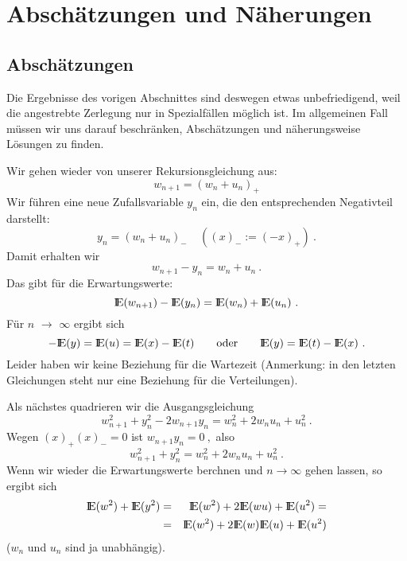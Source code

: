
\chapter{Abschätzungen und Näherungen}
\section{Abschätzungen}
Die Ergebnisse des vorigen Abschnittes sind deswegen etwas unbefriedigend, weil die angestrebte Zerlegung nur in
Spezialfällen möglich ist. Im allgemeinen Fall müssen wir uns darauf beschränken, Abschätzungen und
näherungsweise Lösungen zu finden.

Wir gehen wieder von unserer Rekursionsgleichung aus:
\[w_{n+1} = (w_{n}+u_{n})_{+} \]
Wir führen eine neue Zufallsvariable $y_{n}$ ein, die den entsprechenden Negativteil darstellt:
\[y_{n} = (w_{n}+u_{n})_{-}  ~ ~ ~ ~ ~ ((x)_{-} := (-x)_{+}) ~. \]
Damit erhalten wir
\[ w_{n+1}-y_{n} = w_{n}+u_{n} ~.\]
Das gibt für die Erwartungswerte:
\[{\rm I\kern-0.2em E}(w_{n+1})-{\rm I\kern-0.2em E}(y_{n}) = {\rm I\kern-0.2em E}(w_{n})+{\rm I\kern-0.2em E}(u_{n}) ~.\]
Für $n$ $\rightarrow$ $\infty$ ergibt sich
\[-{\rm I\kern-0.2em E}(y) = {\rm I\kern-0.2em E}(u) = {\rm I\kern-0.2em E}(x) - {\rm I\kern-0.2em E}(t) \qquad \mbox{oder} \qquad {\rm I\kern-0.2em E}(y) = {\rm I\kern-0.2em E}(t) - {\rm I\kern-0.2em E}(x) ~.\]
Leider haben wir keine Beziehung für die Wartezeit (Anmerkung: in den letzten Gleichungen steht nur eine Beziehung für die Verteilungen).

Als nächstes quadrieren wir die Ausgangsgleichung
\[ w_{n+1}^{2}+y_{n}^{2}-2w_{n+1}y_{n}=w_{n}^{2}+2w_{n}u_{n}+u_{n}^{2} ~.\]
Wegen \( (x)_{+}(x)_{-} = 0 \)  ist \( w_{n+1}y_{n} = 0 ~,\) also
\[w_{n+1}^2 + y_{n}^2 = w_{n}^2+2w_{n}u_{n}+u_{n}^2 ~.\]
Wenn wir wieder die Erwartungswerte berchnen und \(n \rightarrow \infty \) gehen lassen, so ergibt sich
\begin{eqnarray*}
{\rm I\kern-0.2em E}(w^{2})+{\rm I\kern-0.2em E}(y^{2})&=&{\rm I\kern-0.2em E}(w^{2})+2{\rm I\kern-0.2em E}(wu)+{\rm I\kern-0.2em E}(u^{2}) = \\
                   &=&{\rm I\kern-0.2em E}(w^{2})+2{\rm I\kern-0.2em E}(w){\rm I\kern-0.2em E}(u)+{\rm I\kern-0.2em E}(u^{2}) \\
\end{eqnarray*}
($w_{n}$ und $u_{n}$ sind ja unabhängig).

